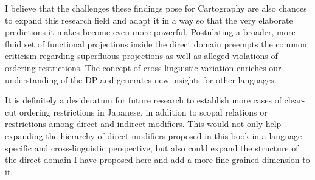 I believe that the challenges these findings pose for Cartography are also chances to expand this research field and adapt it in a way so that the very elaborate predictions it makes become even more powerful. Postulating a broader, more fluid set of functional projections inside the direct domain preempts the common criticism regarding superfluous projections as well as alleged violations of ordering restrictions. The concept of cross-linguistic variation enriches our understanding of the DP and generates new insights for other languages.

It is definitely a desideratum for future research to establish more cases of clear-cut ordering restrictions in Japanese, in addition to scopal relations or restrictions among direct and indirect modifiers. This would not only help expanding the hierarchy of direct modifiers proposed in this book in a language-specific and cross-linguistic perspective, but also could expand the structure of the direct domain I have proposed here and add a more fine-grained dimension to it.
